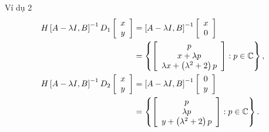 \begin{frame}{Ví dụ 2}
    \begin{align}
        H\left[A-\lambda I,B\right]^{-1}D_{1}\left[\begin{array}{c}
        x\\
        y
        \end{array}\right] & =\left[A-\lambda I,B\right]^{-1}\left[\begin{array}{c}
        x\\
        0
        \end{array}\right] \nonumber\\
         & =\left\{ \left[\begin{array}{c}
        p\\
        x+\lambda p\\
        \lambda x+\left(\lambda^{2}+2\right)p
        \end{array}\right]:p\in\mathbb{C}\right\} ,\\
        H\left[A-\lambda I,B\right]^{-1}D_{2}\left[\begin{array}{c}
        x\\
        y
        \end{array}\right] & =\left[A-\lambda I,B\right]^{-1}\left[\begin{array}{c}
        0\\
        y
        \end{array}\right] \nonumber\\
         & =\left\{ \left[\begin{array}{c}
        p\\
        \lambda p\\
        y+\left(\lambda^{2}+2\right)p
        \end{array}\right]:p\in\mathbb{C}\right\} .
    \end{align}
\end{frame}



